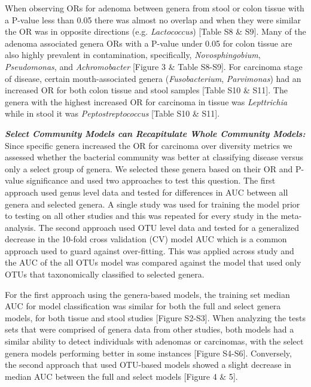 \documentclass[12pt,]{article}
\begin{document}
When observing ORs for adenoma between genera from stool or colon tissue
with a P-value less than 0.05 there was almost no overlap and when they
were similar the OR was in opposite directions (e.g. \emph{Lactococcus})
{[}Table S8 \& S9{]}. Many of the adenoma associated genera ORs with a
P-value under 0.05 for colon tissue are also highly prevalent in
contamination, specifically, \emph{Novosphingobium}, \emph{Pseudomonas},
and \emph{Achromobacter} {[}Figure 3 \& Table S8-S9{]}. For carcinoma
stage of disease, certain mouth-associated genera (\emph{Fusobacterium},
\emph{Parvimonas}) had an increased OR for both colon tissue and stool
samples {[}Table S10 \& S11{]}. The genera with the highest increased OR
for carcinoma in tissue was \emph{Lepttrichia} while in stool it was
\emph{Peptostreptococcus} {[}Table S10 \& S11{]}.

\textbf{\emph{Select Community Models can Recapitulate Whole Community
Models:}} Since specific genera increased the OR for carcinoma over
diversity metrics we assessed whether the bacterial community was better
at classifying disease versus only a select group of genera. We selected
these genera based on their OR and P-value significance and used two
approaches to test this question. The first approach used genus level
data and tested for differences in AUC between all genera and selected
genera. A single study was used for training the model prior to testing
on all other studies and this was repeated for every study in the
meta-analysis. The second approach used OTU level data and tested for a
generalized decrease in the 10-fold cross validation (CV) model AUC
which is a common approach used to guard against over-fitting. This was
applied across study and the AUC of the all OTUs model was compared
against the model that used only OTUs that taxonomically classified to
selected genera.

For the first approach using the genera-based models, the training set
median AUC for model classification was similar for both the full and
select genera models, for both tissue and stool studies {[}Figure
S2-S3{]}. When analyzing the tests sets that were comprised of genera
data from other studies, both models had a similar ability to detect
individuals with adenomas or carcinomas, with the select genera models
performing better in some instances {[}Figure S4-S6{]}. Conversely, the
second approach that used OTU-based models showed a slight decrease in
median AUC between the full and select models {[}Figure 4 \& 5{]}.
\end{document}
